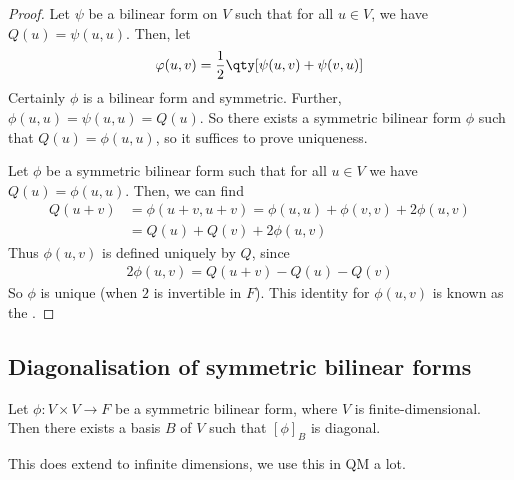 \begin{proof}
	Let $\psi$ be a bilinear form on $V$ such that for all $u \in V$, we have $Q(u) = \psi(u,u)$.
	Then, let
	\begin{align*}
		\phi(u,v) = \frac{1}{2}\qty[\psi(u,v) + \psi(v,u)]
	\end{align*}
	Certainly $\phi$ is a bilinear form and symmetric.
	Further, $\phi(u,u) = \psi(u,u) = Q(u)$.
	So there exists a symmetric bilinear form $\phi$ such that $Q(u) = \phi(u,u)$, so it suffices to prove uniqueness.

	Let $\phi$ be a symmetric bilinear form such that for all $u \in V$ we have $Q(u) = \phi(u,u)$.
	Then, we can find
	\begin{align*}
		Q(u + v) &= \phi(u + v, u + v) = \phi(u,u) + \phi(v,v) + 2\phi(u,v) \\
		&= Q(u) + Q(v) + 2 \phi(u, v)
	\end{align*}
	Thus $\phi(u,v)$ is defined uniquely by $Q$, since
	\begin{align*}
		2 \phi(u,v) = Q(u+v) - Q(u) - Q(v)
	\end{align*}
	So $\phi$ is unique (when $2$ is invertible in $F$).
	This identity for $\phi(u,v)$ is known as the .
\end{proof}

\subsection{Diagonalisation of symmetric bilinear forms}
\begin{theorem}
	Let $\phi \colon V \times V \to F$ be a symmetric bilinear form, where $V$ is finite-dimensional.
	Then there exists a basis $B$ of $V$ such that $[\phi]_B$ is diagonal.
\end{theorem}

This does extend to infinite dimensions, we use this in QM a lot.

